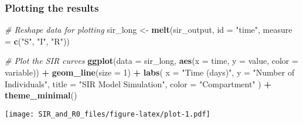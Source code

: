 \documentclass[
]{article}
\newenvironment{Shaded}{\begin{snugshade}}{\end{snugshade}}
\newcommand{\AttributeTok}[1]{\textcolor[rgb]{0.13,0.29,0.53}{#1}}
\newcommand{\CommentTok}[1]{\textcolor[rgb]{0.56,0.35,0.01}{\textit{#1}}}
\newcommand{\DecValTok}[1]{\textcolor[rgb]{0.00,0.00,0.81}{#1}}
\newcommand{\FunctionTok}[1]{\textcolor[rgb]{0.13,0.29,0.53}{\textbf{#1}}}
\newcommand{\NormalTok}[1]{#1}
\newcommand{\OtherTok}[1]{\textcolor[rgb]{0.56,0.35,0.01}{#1}}
\newcommand{\SpecialCharTok}[1]{\textcolor[rgb]{0.81,0.36,0.00}{\textbf{#1}}}
\newcommand{\StringTok}[1]{\textcolor[rgb]{0.31,0.60,0.02}{#1}}
\begin{document}
\hypertarget{plotting-the-results}{%
\subsubsection{Plotting the results}\label{plotting-the-results}}

\begin{Shaded}
\begin{Highlighting}[]
\CommentTok{\# Reshape data for plotting}
\NormalTok{sir\_long }\OtherTok{\textless{}{-}} \FunctionTok{melt}\NormalTok{(sir\_output, }\AttributeTok{id =} \StringTok{"time"}\NormalTok{, }\AttributeTok{measure =} \FunctionTok{c}\NormalTok{(}\StringTok{"S"}\NormalTok{, }\StringTok{"I"}\NormalTok{, }\StringTok{"R"}\NormalTok{))}

\CommentTok{\# Plot the SIR curves}
\FunctionTok{ggplot}\NormalTok{(}\AttributeTok{data =}\NormalTok{ sir\_long, }\FunctionTok{aes}\NormalTok{(}\AttributeTok{x =}\NormalTok{ time, }\AttributeTok{y =}\NormalTok{ value, }\AttributeTok{color =}\NormalTok{ variable)) }\SpecialCharTok{+}
  \FunctionTok{geom\_line}\NormalTok{(}\AttributeTok{size =} \DecValTok{1}\NormalTok{) }\SpecialCharTok{+}
  \FunctionTok{labs}\NormalTok{(}
    \AttributeTok{x =} \StringTok{"Time (days)"}\NormalTok{,}
    \AttributeTok{y =} \StringTok{"Number of Individuals"}\NormalTok{,}
    \AttributeTok{title =} \StringTok{"SIR Model Simulation"}\NormalTok{,}
    \AttributeTok{color =} \StringTok{"Compartment"}
\NormalTok{  ) }\SpecialCharTok{+}
  \FunctionTok{theme\_minimal}\NormalTok{()}
\end{Highlighting}
\end{Shaded}

\texttt{[image: SIR\_and\_R0\_files/figure-latex/plot-1.pdf]}
\end{document}
